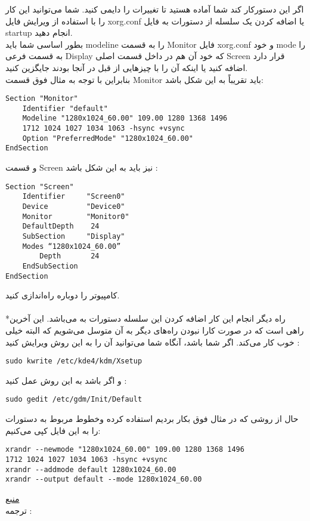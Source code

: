 \documentclass[a4paper,12pt]{article}
\begin{document}
اگر این دستورکار کند شما آماده هستید تا تغییرات را دایمی کنید. شما می‌توانید این کار را با استفاده از ویرایش فایل xorg.conf یا اضافه کردن یک سلسله از دستورات به فایل startup  انجام دهید.\\
بطور اساسی شما باید modeline را به قسمت Monitor فایل xorg.conf و خود mode را به قسمت فرعی  Display که خود آن هم در داخل قسمت اصلی Screen قرار دارد اضافه کنید یا اینکه آن را با چیزهایی از قبل در آنجا بودند جایگزین کنید.\\
بنابراین با توجه به مثال فوق قسمت Monitor باید تقریباً به این شکل باشد:
\begin{LTR}
\begin{Verbatim}[frame=single,formatcom=\color{red}]
Section "Monitor"
    Identifier "default"
    Modeline "1280x1024_60.00" 109.00 1280 1368 1496 
    1712 1024 1027 1034 1063 -hsync +vsync 
    Option "PreferredMode" "1280x1024_60.00"
EndSection
\end{Verbatim}
\end{LTR}
و قسمت Screen نیز باید به این شکل باشد :
\begin{LTR}
\begin{Verbatim}[frame=single,formatcom=\color{red}]
Section "Screen"
    Identifier     "Screen0"
    Device         "Device0"
    Monitor        "Monitor0"
    DefaultDepth    24
    SubSection     "Display"
    Modes “1280x1024_60.00”
        Depth       24
    EndSubSection
EndSection
\end{Verbatim}
\end{LTR}
کامپیوتر را دوباره راه‌اندازی کنید.
\\
\\
*راه دیگر انجام این کار اضافه کردن این سلسله دستورات به  می‌باشد. این  آخرین راهی است که در صورت کارا نبودن راه‌های دیگر به آن متوسل می‌شویم که البته خیلی خوب کار می‌کند.
اگر  شما  باشد، آنگاه شما می‌توانید  آن را به این روش ویرایش کنید :
\begin{LTR}
\begin{Verbatim}[frame=single,formatcom=\color{magenta}]
sudo kwrite /etc/kde4/kdm/Xsetup
\end{Verbatim}
\end{LTR}
و اگر  باشد به این روش عمل کنید :
\begin{LTR}
\begin{Verbatim}[frame=single,formatcom=\color{magenta}]
sudo gedit /etc/gdm/Init/Default
\end{Verbatim}
\end{LTR}
حال از روشی که در مثال فوق بکار بردیم استفاده کرده وخطوط مربوط به دستورات را به این فایل کپی می‌کنیم:
\begin{LTR}
\begin{Verbatim}[frame=single,formatcom=\color{red}]
xrandr --newmode "1280x1024_60.00" 109.00 1280 1368 1496 
1712 1024 1027 1034 1063 -hsync +vsync
xrandr --addmode default 1280x1024_60.00
xrandr --output default --mode 1280x1024_60.00
\end{Verbatim}
\end{LTR}

\begin{flushleft}
\end{flushleft}

\href{http://www.linuxjournal.com/content/guerrilla-tactics-force-screen-mode-ubuntu}{منبع}\\
ترجمه : 
\end{document}
